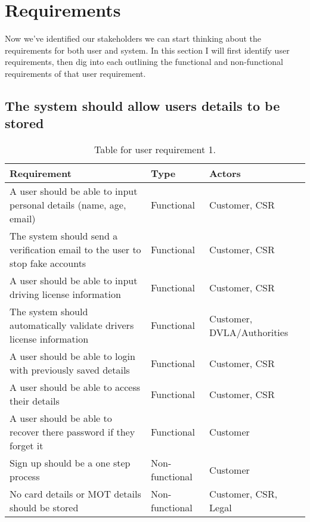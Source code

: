 \section{Requirements}
  Now we've identified our stakeholders we can start thinking about the requirements for both user and system. In this section I will first identify user
  requirements, then dig into each outlining the functional and non-functional requirements of that user requirement.

  \subsection{The system should allow users details to be stored}
    \begin{table}[H]
      \centering
      \begin{tabular}{|p{}|p{}|p{}|}
        \hline
        Requirement & Type & Actors \\ \hline
        A user should be able to input personal details (name, age, email) & Functional & Customer, CSR \\ \hline
        The system should send a verification email to the user to stop fake accounts & Functional & Customer, CSR \\ \hline
        A user should be able to input driving license information & Functional & Customer, CSR \\ \hline
        The system should automatically validate drivers license information & Functional & Customer, DVLA/Authorities \\ \hline
        A user should be able to login with previously saved details & Functional & Customer, CSR \\ \hline
        A user should be able to access their details & Functional & Customer, CSR \\ \hline
        A user should be able to recover there password if they forget it & Functional  & Customer \\ \hline
        Sign up should be a one step process & Non-functional & Customer \\ \hline
        No card details or MOT details should be stored & Non-functional & Customer, CSR, Legal \\ \hline
      \end{tabular}
      \caption{Table for user requirement 1.}
    \end{table}

